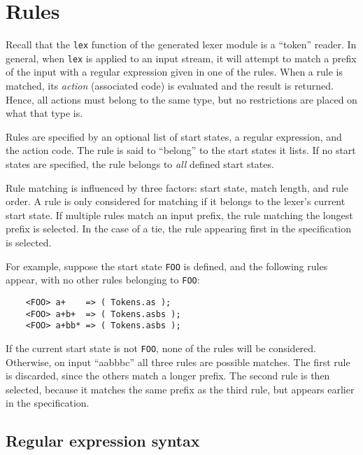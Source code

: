 \section{Rules}\label{sec:ulex-rules}

Recall that the \texttt{lex} function of the generated lexer module is a ``token'' reader.  In general, when \texttt{lex} is applied to an input stream, it will attempt to match a prefix of the input with a regular expression given in one of the rules.  When a rule is matched, its \emph{action} (associated code) is evaluated and the result is returned.  Hence, all actions must belong to the same type, but no restrictions are placed on what that type is.

Rules are specified by an optional list of start states, a regular expression, and the action code.  The rule is said to ``belong'' to the start states it lists.  If no start states are specified, the rule belongs to \emph{all} defined start states.

Rule matching is influenced by three factors: start state, match length, and rule order.  A rule is only considered for matching if it belongs to the lexer's current start state.  If multiple rules match an input prefix, the rule matching the longest prefix is selected.  In the case of a tie, the rule appearing first in the specification is selected.

For example, suppose the start state {\tt FOO} is defined, and the following rules appear, with no other rules belonging to {\tt FOO}:
\begin{verbatim}
    <FOO> a+    => ( Tokens.as );
    <FOO> a+b+  => ( Tokens.asbs );
    <FOO> a+bb* => ( Tokens.asbs );
\end{verbatim}
If the current start state is not {\tt FOO}, none of the rules will be considered.  Otherwise, on input ``aabbbc'' all three rules are possible matches.  The first rule is discarded, since the others match a longer prefix.  The second rule is then selected, because it matches the same prefix as the third rule, but appears earlier in the specification.

\subsection{Regular expression syntax}

